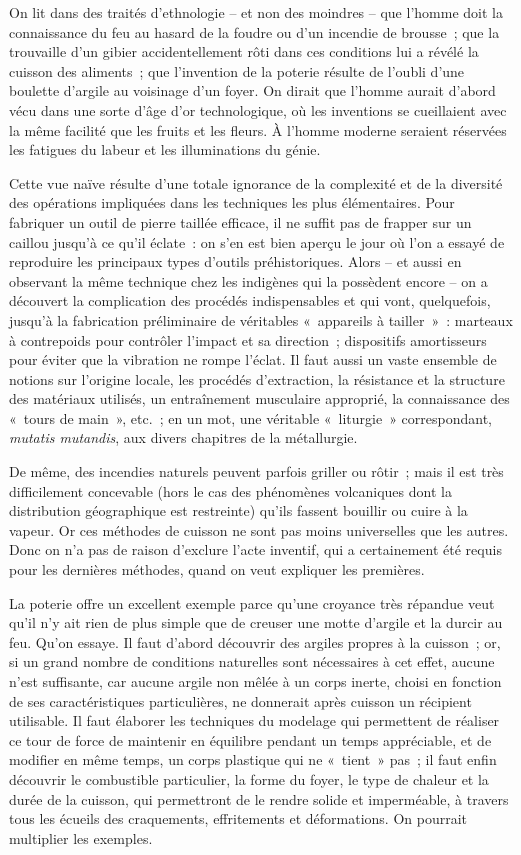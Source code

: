 \documentclass[french,twoside]{book} %
\begin{document}
\noindent On lit dans des traités d’ethnologie – et non des moindres – que l’homme doit la connaissance du feu au hasard de la foudre ou d’un incendie de brousse ; que la trouvaille d’un gibier accidentellement rôti dans ces conditions lui a révélé la cuisson des aliments ; que l’invention de la poterie résulte de l’oubli d’une boulette d’argile au voisinage d’un foyer. On dirait que l’homme aurait d’abord vécu dans une sorte d’âge d’or technologique, où les inventions se cueillaient avec la même facilité que les fruits et les fleurs. À l’homme moderne seraient réservées les fatigues du labeur et les illuminations du génie.\par
Cette vue naïve résulte d’une totale ignorance de la complexité et de la diversité des opérations impliquées dans les techniques les plus élémentaires. Pour fabriquer un outil de pierre taillée efficace, il ne suffit pas de frapper sur un caillou jusqu’à ce qu’il éclate : on s’en est bien aperçu le jour où l’on a essayé de reproduire les principaux types d’outils préhistoriques. Alors – et aussi en observant la même technique chez les indigènes qui la possèdent encore – on a découvert la complication des procédés indispensables et qui vont, quelquefois, jusqu’à la fabrication préliminaire de véritables « appareils à tailler » : marteaux à contrepoids pour contrôler l’impact et sa direction ; dispositifs amortisseurs pour éviter que la vibration ne rompe l’éclat. Il faut aussi un vaste ensemble de notions sur l’origine locale, les procédés d’extraction, la résistance et la structure des matériaux utilisés, un entraînement musculaire approprié, la connaissance des « tours de main », etc. ; en un mot, une véritable « liturgie » correspondant, \emph{mutatis mutandis}, aux divers chapitres de la métallurgie.\par
De même, des incendies naturels peuvent parfois griller ou rôtir ; mais il est très difficilement concevable (hors le cas des phénomènes volcaniques dont la distribution géographique est restreinte) qu’ils fassent bouillir ou cuire à la vapeur. Or ces méthodes de cuisson ne sont pas moins universelles que les autres. Donc on n’a pas de raison d’exclure l’acte inventif, qui a certainement été requis pour les dernières méthodes, quand on veut expliquer les premières.\par
La poterie offre un excellent exemple parce qu’une croyance très répandue veut qu’il n’y ait rien de plus simple que de creuser une motte d’argile et la durcir au feu. Qu’on essaye. Il faut d’abord découvrir des argiles propres à la cuisson ; or, si un grand nombre de conditions naturelles sont nécessaires à cet effet, aucune n’est suffisante, car aucune argile non mêlée à un corps inerte, choisi en fonction de ses caractéristiques particulières, ne donnerait après cuisson un récipient utilisable. Il faut élaborer les techniques du modelage qui permettent de réaliser ce tour de force de maintenir en équilibre pendant un temps appréciable, et de modifier en même temps, un corps plastique qui ne « tient » pas ; il faut enfin découvrir le combustible particulier, la forme du foyer, le type de chaleur et la durée de la cuisson, qui permettront de le rendre solide et imperméable, à travers tous les écueils des craquements, effritements et déformations. On pourrait multiplier les exemples.\par
\end{document}
